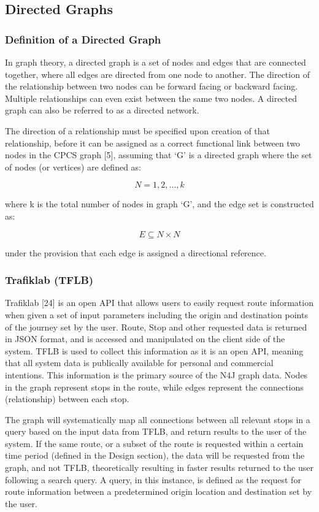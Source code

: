 \documentclass[12pt]{article}   	%
\begin{document}
\newpage

\subsection{Directed Graphs}
\subsubsection{Definition of a Directed Graph}
In graph theory, a directed graph is a set of nodes and edges that are connected together, where all edges are directed from one node to another. The direction of the relationship between two nodes can be forward facing or backward facing. Multiple relationships can even exist between the same two nodes. A directed graph can also be referred to as a directed network.

The direction of a relationship must be specified upon creation of that relationship, before it can be assigned as a correct functional link between two nodes in the CPCS graph [5], assuming that ‘G’ is a directed graph where the set of nodes (or vertices) are defined as:

\hfill
\noindent
\[N = {1, 2, ..., k} \]
\hfill

\noindent
where k is the total number of nodes in graph ‘G’, and the edge set is constructed as:

\hfill
\noindent
\[E \subseteq N \times N \]
\hfill

\noindent
under the provision that each edge is assigned a directional reference.

\newpage

\subsubsection{Trafiklab (TFLB)}
Trafiklab [24] is an open API that allows users to easily request route information when given a set of input parameters including the origin and destination points of the journey set by the user. Route, Stop and other requested data is returned in JSON format, and is accessed and manipulated on the client side of the system. TFLB is used to collect this information as it is an open API, meaning that all system data is publically available for personal and commercial intentions. This information is the primary source of the N4J graph data. Nodes in the graph represent stops in the route, while edges represent the connections (relationship) between each stop.

The graph will systematically map all connections between all relevant stops in a query based on the input data from TFLB, and return results to the user of the system. If the same route, or a subset of the route is requested within a certain time period (defined in the Design section), the data will be requested from the graph, and not TFLB, theoretically resulting in faster results returned to the user following a search query. A query, in this instance, is defined as the request for route information between a predetermined origin location and destination set by the user.
\end{document}
